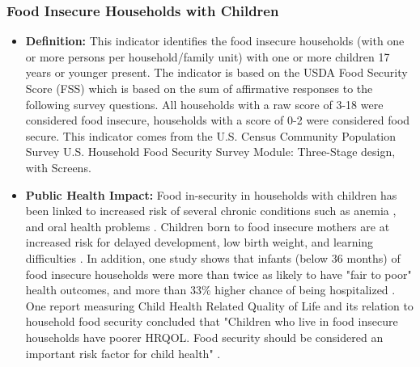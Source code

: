 \documentclass[12pt,letterpaper]{report}
\begin{document}
\subsubsection{Food Insecure Households with Children} 
	\begin{itemize}
		\item \textbf{Definition:} This indicator identifies the food insecure households (with one or more persons per household/family unit) with one or more children 17 years or younger present. The indicator is based on the USDA Food Security Score (FSS) which is based on the sum of affirmative responses to the following survey questions. All households with a raw score of 3-18 were considered food insecure, households with a score of 0-2 were considered food secure. This indicator comes from the U.S. Census Community Population Survey U.S. Household Food Security Survey Module: Three-Stage design, with Screens.
		\item \textbf{Public Health Impact:} Food in-security in households with children has been linked to increased risk of several chronic conditions such as anemia \cite{eicher2009food}, and oral health problems \cite{muirhead2009oral}. Children born to food insecure mothers are at increased risk for delayed development, low birth weight, and learning difficulties \cite{cook2008brief} \cite{cook2004food} \cite{jyoti2005food} \cite{skalicky2006child}. In addition, one study shows that infants (below 36 months) of food insecure households were more than twice as likely to have "fair to poor" health outcomes, and more than 33\% higher chance of being hospitalized \cite{cook2004food}. One report measuring Child Health Related Quality of Life and its relation to household food security concluded that "Children who live in food insecure households have poorer HRQOL. Food security should be considered an important risk factor for child health" \cite{casey2005child}.


\end{itemize}
\end{document}

